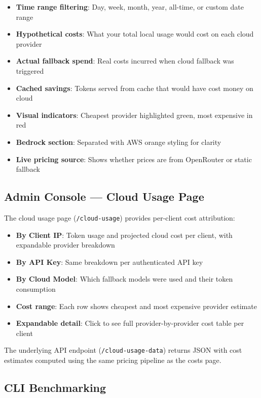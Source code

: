\documentclass[11pt,a4paper]{article}
\begin{document}
\begin{itemize}
  \item \textbf{Time range filtering}: Day, week, month, year, all-time, or custom date range
  \item \textbf{Hypothetical costs}: What your total local usage would cost on each cloud provider
  \item \textbf{Actual fallback spend}: Real costs incurred when cloud fallback was triggered
  \item \textbf{Cached savings}: Tokens served from cache that would have cost money on cloud
  \item \textbf{Visual indicators}: Cheapest provider highlighted green, most expensive in red
  \item \textbf{Bedrock section}: Separated with AWS orange styling for clarity
  \item \textbf{Live pricing source}: Shows whether prices are from OpenRouter or static fallback
\end{itemize}

\subsection{Admin Console --- Cloud Usage Page}

The cloud usage page (\texttt{/cloud-usage}) provides per-client cost attribution:

\begin{itemize}
  \item \textbf{By Client IP}: Token usage and projected cloud cost per client, with expandable provider breakdown
  \item \textbf{By API Key}: Same breakdown per authenticated API key
  \item \textbf{By Cloud Model}: Which fallback models were used and their token consumption
  \item \textbf{Cost range}: Each row shows cheapest and most expensive provider estimate
  \item \textbf{Expandable detail}: Click to see full provider-by-provider cost table per client
\end{itemize}

The underlying API endpoint (\texttt{/cloud-usage-data}) returns JSON with cost estimates computed using the same pricing pipeline as the costs page.

\subsection{CLI Benchmarking}
\end{document}

